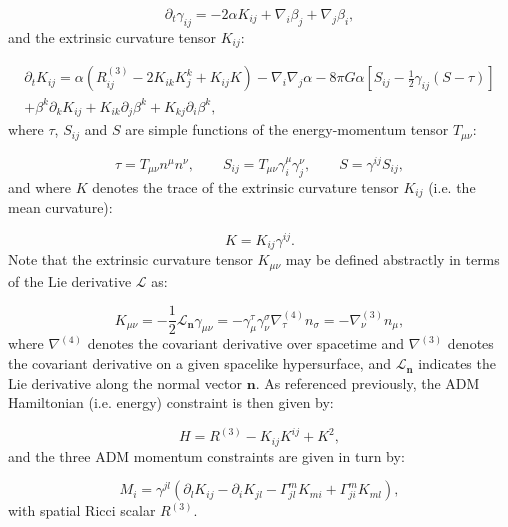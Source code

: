 \documentclass{article}
\begin{document}
\begin{equation}
\partial_t \gamma_{i j} = -2 \alpha K_{i j} + \nabla_i \beta_j + \nabla_j \beta_i,
\end{equation}
and the extrinsic curvature tensor ${K_{i j}}$:

\begin{multline}
\partial_t K_{i j} = \alpha \left( R_{i j}^{\left( 3 \right)} - 2 K_{i k} K_{j}^{k} + K_{i j} K \right) - \nabla_i \nabla_j \alpha - 8 \pi G \alpha \left[ S_{i j} - \frac{1}{2} \gamma_{i j} \left( S - \tau \right) \right]\\
+ \beta^k \partial_k K_{i j} + K_{i k} \partial_j \beta^k + K_{k j} \partial_i \beta^k,
\end{multline}
where ${\tau}$, ${S_{i j}}$ and $S$ are simple functions of the energy-momentum tensor ${T_{\mu \nu}}$:

\begin{equation}
\tau = T_{\mu \nu} n^{\mu} n^{\nu} , \qquad S_{i j} = T_{\mu \nu} \gamma_{i}^{\mu} \gamma_{j}^{\nu}, \qquad S = \gamma^{i j} S_{i j},
\end{equation}
and where $K$ denotes the trace of the extrinsic curvature tensor ${K_{i j}}$ (i.e. the mean curvature):

\begin{equation}
K = K_{i j} \gamma^{i j}.
\end{equation}
Note that the extrinsic curvature tensor ${K_{\mu \nu}}$ may be defined abstractly in terms of the Lie derivative ${\mathcal{L}}$ as:

\begin{equation}
K_{\mu \nu} = - \frac{1}{2} \mathcal{L}_{\mathbf{n}} \gamma_{\mu \nu} = - \gamma_{\mu}^{\tau} \gamma_{\nu}^{\sigma} \nabla_{\tau}^{\left( 4 \right)} n_{\sigma} = - \nabla_{\nu}^{\left( 3 \right)} n_{\mu},
\end{equation}
where ${\nabla^{\left( 4 \right)}}$ denotes the covariant derivative over spacetime and ${\nabla^{\left( 3 \right)}}$ denotes the covariant derivative on a given spacelike hypersurface, and ${\mathcal{L}_{\mathbf{n}}}$ indicates the Lie derivative along the normal vector ${\mathbf{n}}$. As referenced previously, the ADM Hamiltonian (i.e. energy) constraint is then given by:

\begin{equation}
H = R^{\left( 3 \right)} - K_{i j} K^{i j} + K^2,
\end{equation}
and the three ADM momentum constraints are given in turn by:

\begin{equation}
M_i = \gamma^{j l} \left( \partial_l K_{i j} - \partial_i K_{j l} - \Gamma_{j l}^{m} K_{m i} + \Gamma_{j i}^{m} K_{m l} \right),
\end{equation}
with spatial Ricci scalar ${R^{\left( 3 \right)}}$.
\end{document}
